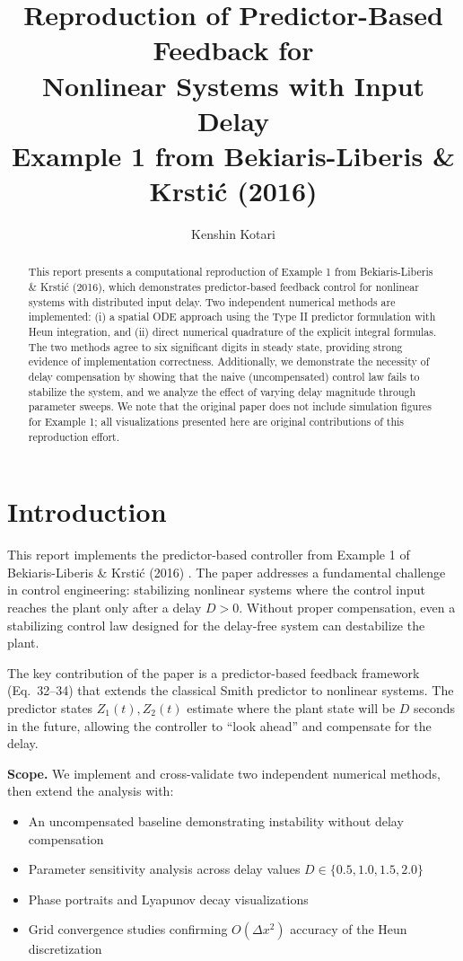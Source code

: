 \documentclass[11pt]{article}
\title{\textbf{Reproduction of Predictor-Based Feedback for\\Nonlinear Systems with Input Delay}\\[0.5em]
\large Example 1 from Bekiaris-Liberis \& Krsti\'{c} (2016)}
\author{Kenshin Kotari}
\date{}
\begin{document}
\maketitle
\vspace{-2em}

\begin{abstract}
This report presents a computational reproduction of Example 1 from Bekiaris-Liberis \& Krsti\'{c} (2016), which demonstrates predictor-based feedback control for nonlinear systems with distributed input delay. Two independent numerical methods are implemented: (i) a spatial ODE approach using the Type II predictor formulation with Heun integration, and (ii) direct numerical quadrature of the explicit integral formulas. The two methods agree to six significant digits in steady state, providing strong evidence of implementation correctness. Additionally, we demonstrate the necessity of delay compensation by showing that the naive (uncompensated) control law fails to stabilize the system, and we analyze the effect of varying delay magnitude through parameter sweeps. We note that the original paper does not include simulation figures for Example 1; all visualizations presented here are original contributions of this reproduction effort.
\end{abstract}


\section{Introduction}

This report implements the predictor-based controller from Example 1 of Bekiaris-Liberis \& Krsti\'{c} (2016) \cite{bekiaris2016}. The paper addresses a fundamental challenge in control engineering: stabilizing nonlinear systems where the control input reaches the plant only after a delay $D > 0$. Without proper compensation, even a stabilizing control law designed for the delay-free system can destabilize the plant.

The key contribution of the paper is a predictor-based feedback framework (Eq.~32--34) that extends the classical Smith predictor to nonlinear systems. The predictor states $Z_1(t), Z_2(t)$ estimate where the plant state will be $D$ seconds in the future, allowing the controller to ``look ahead'' and compensate for the delay.

\textbf{Scope.} We implement and cross-validate two independent numerical methods, then extend the analysis with:
\begin{itemize}
\item An uncompensated baseline demonstrating instability without delay compensation
\item Parameter sensitivity analysis across delay values $D \in \{0.5, 1.0, 1.5, 2.0\}$
\item Phase portraits and Lyapunov decay visualizations
\item Grid convergence studies confirming $O(\Delta x^2)$ accuracy of the Heun discretization
\end{itemize}
\end{document}
